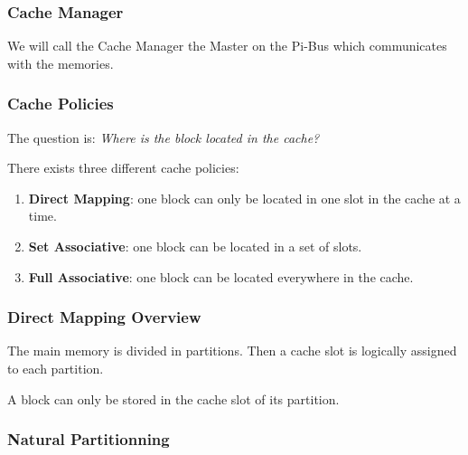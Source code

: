 
\begin{frame}
  \frametitle{Cache Manager}

  We will call the Cache Manager the Master on the Pi-Bus which communicates
  with the memories.

  \begin{center}
  \end{center}
\end{frame}


\begin{frame}
  \frametitle{Cache Policies}

  The question is: \textit{Where is the block located in the cache?}

  \nl

  There exists three different cache policies:

  \begin{enumerate}[<+->]
    \item
      \textbf{Direct Mapping}: one block can only be located in one
      slot in the cache at a time.
    \item
      \textbf{Set Associative}: one block can be located in a set of
      slots.
    \item
      \textbf{Full Associative}: one block can be located everywhere
      in the cache.
  \end{enumerate}
\end{frame}


\begin{frame}
  \frametitle{Direct Mapping Overview}

  The main memory is divided in partitions. Then a cache slot is
  logically assigned to each partition.

  \nl

  A block can only be stored in the cache slot of its partition.
\end{frame}


\begin{frame}
  \frametitle{Natural Partitionning}

  \begin{center}
  \end{center}
\end{frame}


